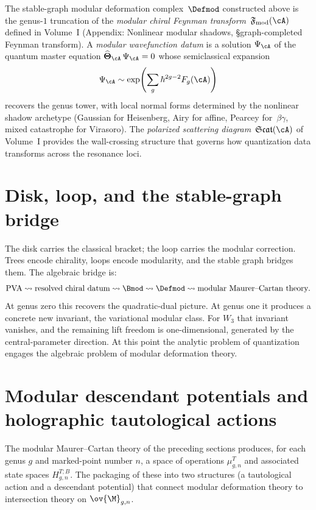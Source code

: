 \begin{remark}
\label{rem:modular-wavefunction-connection}
The stable-graph modular deformation complex~$\Defmod$ constructed above
is the genus-$1$ truncation of the \emph{modular chiral Feynman
transform}~$\mathfrak{F}_{\mathrm{mod}}(\cA)$ defined in
Volume~I (Appendix: Nonlinear modular shadows,
\S\textup{graph-completed Feynman transform}).
A \emph{modular wavefunction datum} is a solution
\(\Psi_\cA\) of the
quantum master equation $\widehat{\boldsymbol\Theta}_\cA\,\Psi_\cA=0$
whose semiclassical expansion
\[
\Psi_\cA \sim \exp\!\left(\sum_{g} \hbar^{2g-2} F_g(\cA)\right)
\]
recovers
the genus tower, with local normal forms determined by the nonlinear
shadow archetype (Gaussian for Heisenberg, Airy for affine,
Pearcey for~$\beta\gamma$, mixed catastrophe for Virasoro).
The \emph{polarized scattering diagram}~$\mathfrak{Scat}(\cA)$ of
Volume~I provides the wall-crossing structure that governs how
quantization data transforms across the resonance loci.
\end{remark}

\section*{Disk, loop, and the stable-graph bridge}

The disk carries the classical bracket; the loop carries the modular correction. Trees encode
chirality, loops encode modularity, and the stable graph bridges them.
The algebraic bridge is:
\[
\text{PVA}
\rightsquigarrow
\text{resolved chiral datum}
\rightsquigarrow
\Bmod
\rightsquigarrow
\Defmod
\rightsquigarrow
\text{modular Maurer--Cartan theory}.
\]
At genus zero this recovers the quadratic-dual picture. At genus one it produces
a concrete new invariant, the variational modular class. For $W_3$ that invariant vanishes,
and the remaining lift freedom is one-dimensional, generated by the central-parameter
direction. At this point the analytic problem of quantization engages the algebraic problem
of modular deformation theory.

\section{Modular descendant potentials and holographic tautological actions}
\label{sec:modular-descendant-potentials}

The modular Maurer--Cartan theory of the preceding sections produces, for each genus $g$
and marked-point number $n$, a space of operations $\mu_{g,n}^T$ and associated state
spaces $H_{g,n}^{T;B}$. The packaging of these into two structures (a tautological action
and a descendant potential) that connect modular deformation theory to intersection
theory on $\ov{\M}_{g,n}$.

